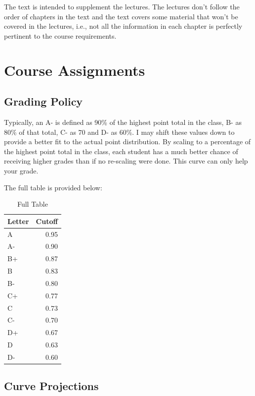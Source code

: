 The text \citep{anastasi1997} is intended to supplement the lectures. The lectures don't follow the order of chapters in the text and the text covers some material that won't be covered in the lectures, i.e., not all the information in each chapter is perfectly pertinent to the course requirements.

\hypertarget{course-assignments-2}{%
\section*{Course Assignments}\label{course-assignments-2}}


\hypertarget{grading-policy-2}{%
\subsection*{Grading Policy}\label{grading-policy-2}}


Typically, an A- is defined as 90\% of the highest point total in the class, B- as 80\% of that total, C- as 70 and D- as 60\%.
I may shift these values down to provide a better fit to the actual point distribution.
By scaling to a percentage of the highest point total in the class, each student has a much better chance of receiving higher grades than if no re-scaling were done.
This curve can only help your grade.

The full table is provided below:

\begin{table}

\caption{\label{tab:unnamed-chunk-4}Full Table}
\centering
\begin{tabular}[t]{l|r}
\hline
Letter & Cutoff\\
\hline
A & 0.95\\
\hline
A- & 0.90\\
\hline
B+ & 0.87\\
\hline
B & 0.83\\
\hline
B- & 0.80\\
\hline
C+ & 0.77\\
\hline
C & 0.73\\
\hline
C- & 0.70\\
\hline
D+ & 0.67\\
\hline
D & 0.63\\
\hline
D- & 0.60\\
\hline
\end{tabular}
\end{table}

\hypertarget{curve-projections-2}{%
\subsection*{Curve Projections}\label{curve-projections-2}}


